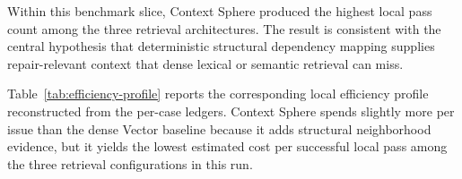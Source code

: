 \begin{table}[t]
\centering
\caption{100-case SWE-bench Verified retrieval ablation under the local \texttt{PASS\_TO\_PASS} verification harness.}
\label{tab:verified-ablation-100}
\end{table}

Within this benchmark slice, Context Sphere produced the highest local pass count among the three retrieval architectures. The result is consistent with the central hypothesis that deterministic structural dependency mapping supplies repair-relevant context that dense lexical or semantic retrieval can miss.

Table~\ref{tab:efficiency-profile} reports the corresponding local efficiency profile reconstructed from the per-case ledgers. Context Sphere spends slightly more per issue than the dense Vector baseline because it adds structural neighborhood evidence, but it yields the lowest estimated cost per successful local pass among the three retrieval configurations in this run.

\begin{table}[t]
\centering
\caption{Local efficiency profile reconstructed from per-case token and cost ledgers. Costs are estimates under the configured DeepSeek/MiniMax routing profile, not official benchmark fees.}
\label{tab:efficiency-profile}
\end{table}

